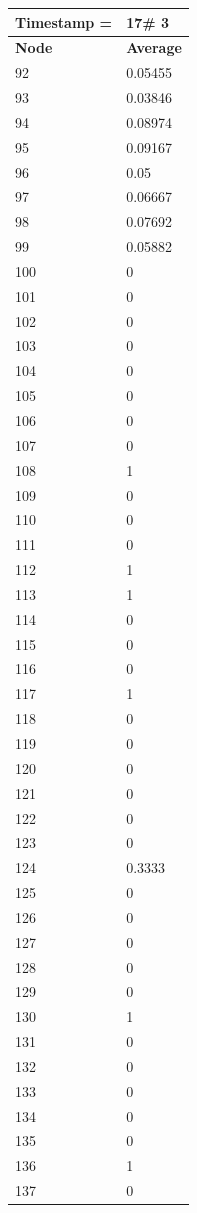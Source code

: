 \begin{tabular}{|l||l|}
\hline
\textbf{Timestamp =} & \textbf{17}\# 3\\\hline
	\textbf{Node} & \textbf{Average} \\ \hline
\hline
	92 & 0.05455 \\ \hline
	93 & 0.03846 \\ \hline
	94 & 0.08974 \\ \hline
	95 & 0.09167 \\ \hline
	96 & 0.05 \\ \hline
	97 & 0.06667 \\ \hline
	98 & 0.07692 \\ \hline
	99 & 0.05882 \\ \hline
	100 & 0 \\ \hline
	101 & 0 \\ \hline
	102 & 0 \\ \hline
	103 & 0 \\ \hline
	104 & 0 \\ \hline
	105 & 0 \\ \hline
	106 & 0 \\ \hline
	107 & 0 \\ \hline
	108 & 1 \\ \hline
	109 & 0 \\ \hline
	110 & 0 \\ \hline
	111 & 0 \\ \hline
	112 & 1 \\ \hline
	113 & 1 \\ \hline
	114 & 0 \\ \hline
	115 & 0 \\ \hline
	116 & 0 \\ \hline
	117 & 1 \\ \hline
	118 & 0 \\ \hline
	119 & 0 \\ \hline
	120 & 0 \\ \hline
	121 & 0 \\ \hline
	122 & 0 \\ \hline
	123 & 0 \\ \hline
	124 & 0.3333 \\ \hline
	125 & 0 \\ \hline
	126 & 0 \\ \hline
	127 & 0 \\ \hline
	128 & 0 \\ \hline
	129 & 0 \\ \hline
	130 & 1 \\ \hline
	131 & 0 \\ \hline
	132 & 0 \\ \hline
	133 & 0 \\ \hline
	134 & 0 \\ \hline
	135 & 0 \\ \hline
	136 & 1 \\ \hline
	137 & 0 \\ \hline
\end{tabular}

